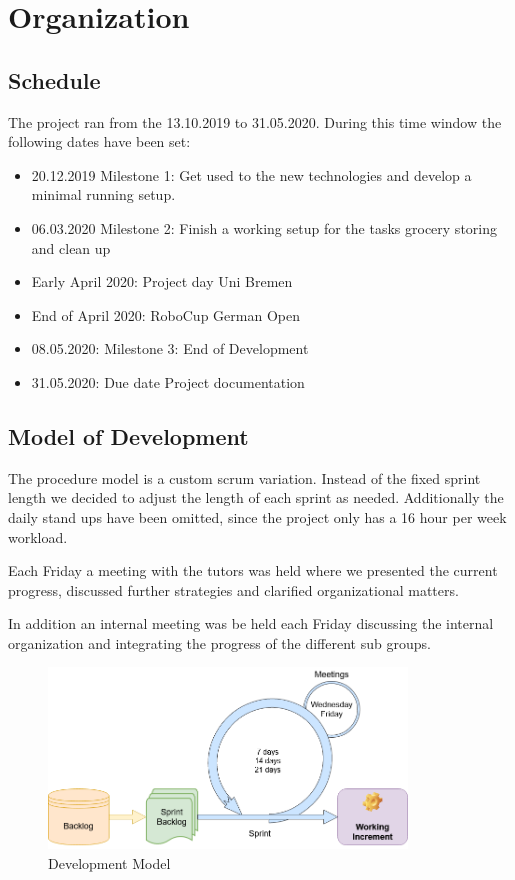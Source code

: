 \documentclass[main.tex]{subfiles}
\begin{document}
	\chapter{Organization}
	\label{organisation}
	
	\section{Schedule}
	The project ran from the 13.10.2019 to 31.05.2020. During this time window the following dates have been set:
	\begin{itemize}
		\item 20.12.2019 Milestone 1: Get used to the new technologies and develop a minimal running setup.
		\item 06.03.2020 Milestone 2: Finish a working setup for the tasks grocery storing and clean up
		\item Early April 2020: Project day Uni Bremen
		\item End of April 2020: RoboCup German Open
		\item 08.05.2020: Milestone 3: End of Development
		\item 31.05.2020: Due date Project documentation
	\end{itemize} 

	\section{Model of Development}
	The procedure model is a custom scrum variation. Instead of the fixed sprint length we decided to adjust the length of each sprint as needed. Additionally the daily stand ups have been omitted, since the project only has a 16 hour per week workload.
	
	Each Friday a meeting with the tutors was held where we presented the current progress, discussed further strategies and clarified organizational matters.
	
	In addition an internal meeting was be held each Friday discussing the internal organization and integrating the progress of the different sub groups.
	
	\begin{figure}[h]
		\centering
		\includegraphics[width=0.85\textwidth]{pictures/diagramms/Development-model.png}
		\caption{Development Model}
		\label{developmentmodel}
	\end{figure}
\end{document}
